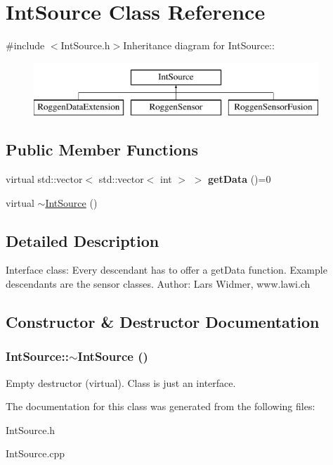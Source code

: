 \hypertarget{classIntSource}{
\section{IntSource Class Reference}
\label{classIntSource}
}


{\ttfamily \#include $<$IntSource.h$>$}Inheritance diagram for IntSource::\begin{figure}[H]
\begin{center}
\leavevmode
\includegraphics[height=2cm]{classIntSource}
\end{center}
\end{figure}
\subsection*{Public Member Functions}
\begin{DoxyCompactItemize}
\item 
\hypertarget{classIntSource_a0a3b7469b2d7d5165b55afc65511eecc}{
virtual std::vector$<$ std::vector$<$ int $>$ $>$ {\bfseries getData} ()=0}
\label{classIntSource_a0a3b7469b2d7d5165b55afc65511eecc}

\item 
virtual \hyperlink{classIntSource_a96642d807a1cb32cbb856cfe0f847542}{$\sim$IntSource} ()
\end{DoxyCompactItemize}


\subsection{Detailed Description}
Interface class: Every descendant has to offer a getData function. Example descendants are the sensor classes. Author: Lars Widmer, www.lawi.ch 

\subsection{Constructor \& Destructor Documentation}
\hypertarget{classIntSource_a96642d807a1cb32cbb856cfe0f847542}{
\subsubsection[{$\sim$IntSource}]{\setlength{\rightskip}{0pt plus 5cm}IntSource::$\sim$IntSource ()}}
\label{classIntSource_a96642d807a1cb32cbb856cfe0f847542}
Empty destructor (virtual). Class is just an interface. 

The documentation for this class was generated from the following files:\begin{DoxyCompactItemize}
\item 
IntSource.h\item 
IntSource.cpp\end{DoxyCompactItemize}
